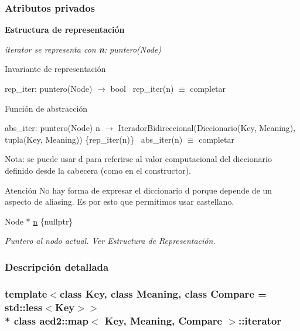 \subsubsection*{Atributos privados}
\begin{Indent}{\bf Estructura de representación}\par
{\em iterator se representa con {\bfseries n}\+: puntero(\+Node)

\begin{DoxyParagraph}{Invariante de representación}

\end{DoxyParagraph}
rep\+\_\+iter\+: puntero(\+Node) $\to$ bool~\newline
rep\+\_\+iter(n) $\equiv$ completar

\begin{DoxyParagraph}{Función de abstracción}

\end{DoxyParagraph}
abs\+\_\+iter\+: puntero(\+Node) n $\to$ Iterador\+Bidireccional(Diccionario(Key, Meaning), tupla(Key, Meaning)) \{rep\+\_\+iter(n)\}~\newline
abs\+\_\+iter(n) $\equiv$ completar

Nota\+: se puede usar {\ttfamily d} para referirse al valor computacional del diccionario definido desde la cabecera (como en el constructor).

\begin{DoxyAttention}{Atención}
No hay forma de expresar el diccionario {\ttfamily d} porque depende de un aspecto de aliasing. Es por esto que permitimos usar castellano. 
\end{DoxyAttention}
}\begin{DoxyCompactItemize}
\item 
Node $\ast$ \hyperlink{classaed2_1_1map_1_1iterator_adf8633ef71bb6c1fc01c0abe8728fd93_adf8633ef71bb6c1fc01c0abe8728fd93}{n} \{nullptr\}
\begin{DoxyCompactList}\small\item\em Puntero al nodo actual. Ver Estructura de Representación. \end{DoxyCompactList}\end{DoxyCompactItemize}
\end{Indent}


\subsubsection{Descripción detallada}
\subsubsection*{template$<$class Key, class Meaning, class Compare = std\+::less$<$\+Key$>$$>$\\*
class aed2\+::map$<$ Key, Meaning, Compare $>$\+::iterator}

